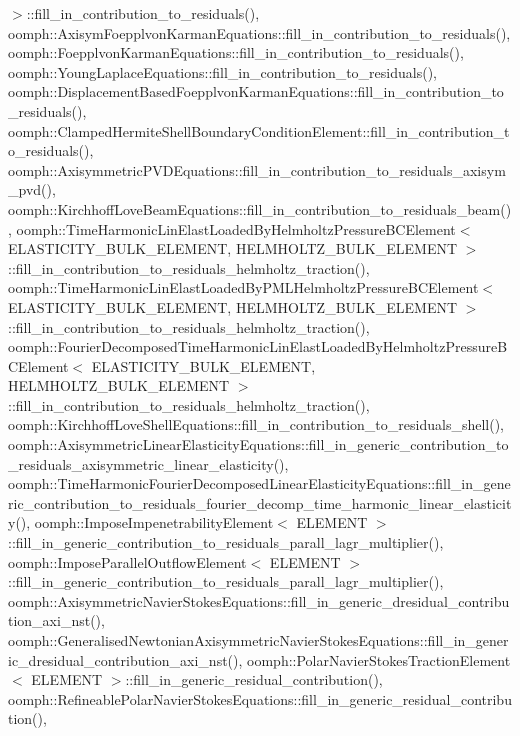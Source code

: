 $>$\+::fill\+\_\+in\+\_\+contribution\+\_\+to\+\_\+residuals(), oomph\+::\+Axisym\+Foepplvon\+Karman\+Equations\+::fill\+\_\+in\+\_\+contribution\+\_\+to\+\_\+residuals(), oomph\+::\+Foepplvon\+Karman\+Equations\+::fill\+\_\+in\+\_\+contribution\+\_\+to\+\_\+residuals(), oomph\+::\+Young\+Laplace\+Equations\+::fill\+\_\+in\+\_\+contribution\+\_\+to\+\_\+residuals(), oomph\+::\+Displacement\+Based\+Foepplvon\+Karman\+Equations\+::fill\+\_\+in\+\_\+contribution\+\_\+to\+\_\+residuals(), oomph\+::\+Clamped\+Hermite\+Shell\+Boundary\+Condition\+Element\+::fill\+\_\+in\+\_\+contribution\+\_\+to\+\_\+residuals(), oomph\+::\+Axisymmetric\+P\+V\+D\+Equations\+::fill\+\_\+in\+\_\+contribution\+\_\+to\+\_\+residuals\+\_\+axisym\+\_\+pvd(), oomph\+::\+Kirchhoff\+Love\+Beam\+Equations\+::fill\+\_\+in\+\_\+contribution\+\_\+to\+\_\+residuals\+\_\+beam(), oomph\+::\+Time\+Harmonic\+Lin\+Elast\+Loaded\+By\+Helmholtz\+Pressure\+B\+C\+Element$<$ E\+L\+A\+S\+T\+I\+C\+I\+T\+Y\+\_\+\+B\+U\+L\+K\+\_\+\+E\+L\+E\+M\+E\+N\+T, H\+E\+L\+M\+H\+O\+L\+T\+Z\+\_\+\+B\+U\+L\+K\+\_\+\+E\+L\+E\+M\+E\+N\+T $>$\+::fill\+\_\+in\+\_\+contribution\+\_\+to\+\_\+residuals\+\_\+helmholtz\+\_\+traction(), oomph\+::\+Time\+Harmonic\+Lin\+Elast\+Loaded\+By\+P\+M\+L\+Helmholtz\+Pressure\+B\+C\+Element$<$ E\+L\+A\+S\+T\+I\+C\+I\+T\+Y\+\_\+\+B\+U\+L\+K\+\_\+\+E\+L\+E\+M\+E\+N\+T, H\+E\+L\+M\+H\+O\+L\+T\+Z\+\_\+\+B\+U\+L\+K\+\_\+\+E\+L\+E\+M\+E\+N\+T $>$\+::fill\+\_\+in\+\_\+contribution\+\_\+to\+\_\+residuals\+\_\+helmholtz\+\_\+traction(), oomph\+::\+Fourier\+Decomposed\+Time\+Harmonic\+Lin\+Elast\+Loaded\+By\+Helmholtz\+Pressure\+B\+C\+Element$<$ E\+L\+A\+S\+T\+I\+C\+I\+T\+Y\+\_\+\+B\+U\+L\+K\+\_\+\+E\+L\+E\+M\+E\+N\+T, H\+E\+L\+M\+H\+O\+L\+T\+Z\+\_\+\+B\+U\+L\+K\+\_\+\+E\+L\+E\+M\+E\+N\+T $>$\+::fill\+\_\+in\+\_\+contribution\+\_\+to\+\_\+residuals\+\_\+helmholtz\+\_\+traction(), oomph\+::\+Kirchhoff\+Love\+Shell\+Equations\+::fill\+\_\+in\+\_\+contribution\+\_\+to\+\_\+residuals\+\_\+shell(), oomph\+::\+Axisymmetric\+Linear\+Elasticity\+Equations\+::fill\+\_\+in\+\_\+generic\+\_\+contribution\+\_\+to\+\_\+residuals\+\_\+axisymmetric\+\_\+linear\+\_\+elasticity(), oomph\+::\+Time\+Harmonic\+Fourier\+Decomposed\+Linear\+Elasticity\+Equations\+::fill\+\_\+in\+\_\+generic\+\_\+contribution\+\_\+to\+\_\+residuals\+\_\+fourier\+\_\+decomp\+\_\+time\+\_\+harmonic\+\_\+linear\+\_\+elasticity(), oomph\+::\+Impose\+Impenetrability\+Element$<$ E\+L\+E\+M\+E\+N\+T $>$\+::fill\+\_\+in\+\_\+generic\+\_\+contribution\+\_\+to\+\_\+residuals\+\_\+parall\+\_\+lagr\+\_\+multiplier(), oomph\+::\+Impose\+Parallel\+Outflow\+Element$<$ E\+L\+E\+M\+E\+N\+T $>$\+::fill\+\_\+in\+\_\+generic\+\_\+contribution\+\_\+to\+\_\+residuals\+\_\+parall\+\_\+lagr\+\_\+multiplier(), oomph\+::\+Axisymmetric\+Navier\+Stokes\+Equations\+::fill\+\_\+in\+\_\+generic\+\_\+dresidual\+\_\+contribution\+\_\+axi\+\_\+nst(), oomph\+::\+Generalised\+Newtonian\+Axisymmetric\+Navier\+Stokes\+Equations\+::fill\+\_\+in\+\_\+generic\+\_\+dresidual\+\_\+contribution\+\_\+axi\+\_\+nst(), oomph\+::\+Polar\+Navier\+Stokes\+Traction\+Element$<$ E\+L\+E\+M\+E\+N\+T $>$\+::fill\+\_\+in\+\_\+generic\+\_\+residual\+\_\+contribution(), oomph\+::\+Refineable\+Polar\+Navier\+Stokes\+Equations\+::fill\+\_\+in\+\_\+generic\+\_\+residual\+\_\+contribution(), 